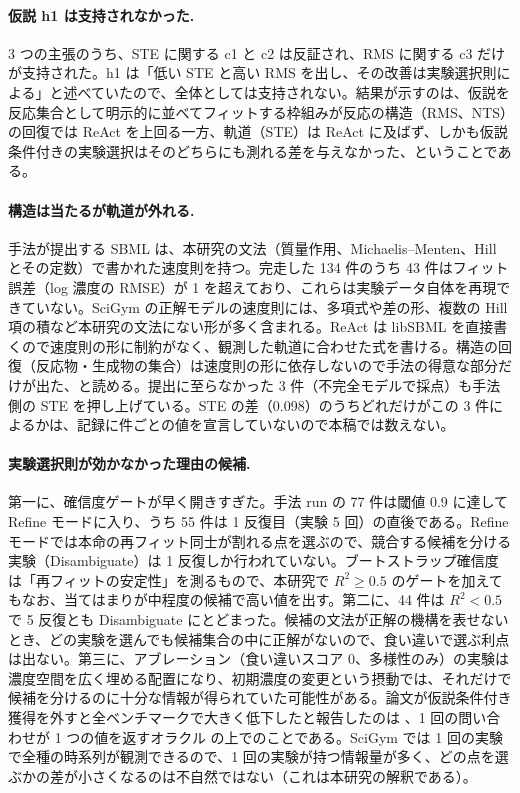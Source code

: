 \documentclass{article}
\begin{document}
\paragraph{仮説 h1 は支持されなかった.}
3 つの主張のうち、STE に関する c1 と c2 は反証され、RMS に関する c3 だけが支持された。h1 は「低い STE と高い RMS を出し、その改善は実験選択則による」と述べていたので、全体としては支持されない。結果が示すのは、仮説を反応集合として明示的に並べてフィットする枠組みが反応の構造（RMS、NTS）の回復では ReAct を上回る一方、軌道（STE）は ReAct に及ばず、しかも仮説条件付きの実験選択はそのどちらにも測れる差を与えなかった、ということである。

\paragraph{構造は当たるが軌道が外れる.}
手法が提出する SBML は、本研究の文法（質量作用、Michaelis--Menten、Hill とその定数）で書かれた速度則を持つ。完走した 134 件のうち 43 件はフィット誤差（log 濃度の RMSE）が 1 を超えており、これらは実験データ自体を再現できていない。SciGym の正解モデルの速度則には、多項式や差の形、複数の Hill 項の積など本研究の文法にない形が多く含まれる。ReAct は libSBML を直接書くので速度則の形に制約がなく、観測した軌道に合わせた式を書ける。構造の回復（反応物・生成物の集合）は速度則の形に依存しないので手法の得意な部分だけが出た、と読める。提出に至らなかった 3 件（不完全モデルで採点）も手法側の STE を押し上げている。STE の差（0.098）のうちどれだけがこの 3 件によるかは、記録に件ごとの値を宣言していないので本稿では数えない。

\paragraph{実験選択則が効かなかった理由の候補.}
第一に、確信度ゲートが早く開きすぎた。手法 run の 77 件は閾値 0.9 に達して Refine モードに入り、うち 55 件は 1 反復目（実験 5 回）の直後である。Refine モードでは本命の再フィット同士が割れる点を選ぶので、競合する候補を分ける実験（Disambiguate）は 1 反復しか行われていない。ブートストラップ確信度は「再フィットの安定性」を測るもので、本研究で $R^2 \ge 0.5$ のゲートを加えてもなお、当てはまりが中程度の候補で高い値を出す。第二に、44 件は $R^2 < 0.5$ で 5 反復とも Disambiguate にとどまった。候補の文法が正解の機構を表せないとき、どの実験を選んでも候補集合の中に正解がないので、食い違いで選ぶ利点は出ない。第三に、アブレーション（食い違いスコア 0、多様性のみ）の実験は濃度空間を広く埋める配置になり、初期濃度の変更という摂動では、それだけで候補を分けるのに十分な情報が得られていた可能性がある。論文が仮説条件付き獲得を外すと全ベンチマークで大きく低下したと報告したのは \cite[s2.p7]{kabra-2026-llm}、1 回の問い合わせが 1 つの値を返すオラクル \cite[s2.p5]{kabra-2026-llm} の上でのことである。SciGym では 1 回の実験で全種の時系列が観測できるので、1 回の実験が持つ情報量が多く、どの点を選ぶかの差が小さくなるのは不自然ではない（これは本研究の解釈である）。
\end{document}
